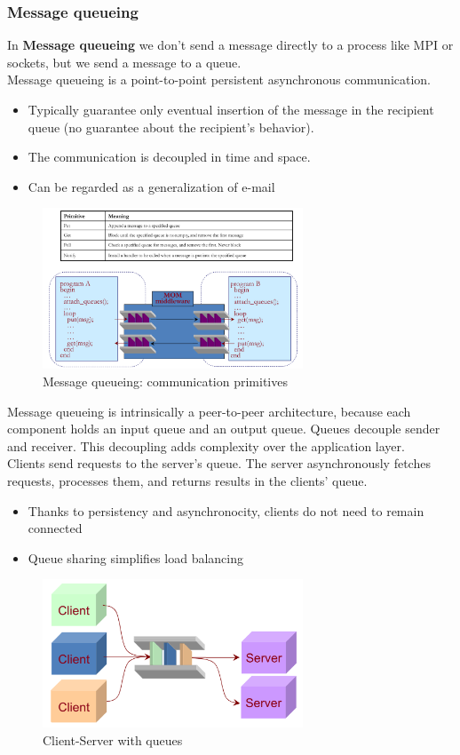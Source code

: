\documentclass[10pt,a4paper]{article}
\begin{document}
\subsubsection{Message queueing}
In \textbf{Message queueing} we don't send a message directly to a process like MPI or sockets, but we send a message to a queue. \\
Message queueing is a point-to-point persistent asynchronous communication.
\begin{itemize}
	\item Typically guarantee only eventual insertion of the message in the recipient queue (no guarantee about the recipient's behavior).
	\item The communication is decoupled in time and space.
	\item Can be regarded as a generalization of e-mail
\end{itemize}
 \begin{figure}[h!]
 \hfill \includegraphics[width=220pt]{images/message-queueing.png}\hspace*{\fill}
 \caption{Message queueing: communication primitives}
  \label{fig:message-queueing}
\end{figure}
Message queueing is intrinsically a peer-to-peer architecture, because each component holds an input queue and an output queue.
Queues decouple sender and receiver. This decoupling adds complexity over the application layer. \\ Clients send requests to the server's queue. The server asynchronously fetches requests, processes them, and returns results in the clients' queue. 
\begin{itemize}
	\item Thanks to persistency and asynchronocity, clients do not need to remain connected
	\item Queue sharing simplifies load balancing
\end{itemize}
 \begin{figure}[h!]
 \hfill \includegraphics[width=220pt]{images/cs-queue.png}\hspace*{\fill}
 \caption{Client-Server with queues}
  \label{fig:cs-queue}
\end{figure}
\end{document}
